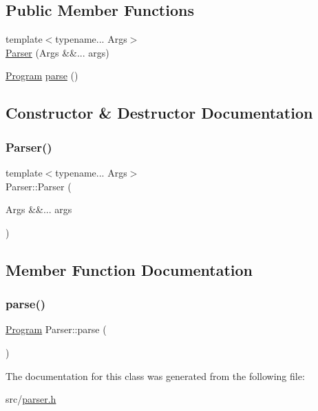 \subsection*{Public Member Functions}
\begin{DoxyCompactItemize}
\item 
{\footnotesize template$<$typename... Args$>$ }\\\hyperlink{class_parser_aefb50af00ae004bfb809380c45a5ad7d}{Parser} (Args \&\&... args)
\item 
\hyperlink{struct_program}{Program} \hyperlink{class_parser_a20466f8f29d69499dfa12092cd737211}{parse} ()
\end{DoxyCompactItemize}


\subsection{Constructor \& Destructor Documentation}
\mbox{\label{class_parser_aefb50af00ae004bfb809380c45a5ad7d}} 
\subsubsection{\texorpdfstring{Parser()}{Parser()}}
{\footnotesize\ttfamily template$<$typename... Args$>$ \\
Parser\+::\+Parser (\begin{DoxyParamCaption}\item[{Args \&\&...}]{args }\end{DoxyParamCaption})\hspace{0.3cm}{\ttfamily [inline]}}



\subsection{Member Function Documentation}
\mbox{\label{class_parser_a20466f8f29d69499dfa12092cd737211}} 
\subsubsection{\texorpdfstring{parse()}{parse()}}
{\footnotesize\ttfamily \hyperlink{struct_program}{Program} Parser\+::parse (\begin{DoxyParamCaption}{ }\end{DoxyParamCaption})\hspace{0.3cm}{\ttfamily [inline]}}



The documentation for this class was generated from the following file\+:\begin{DoxyCompactItemize}
\item 
src/\hyperlink{parser_8h}{parser.\+h}\end{DoxyCompactItemize}
